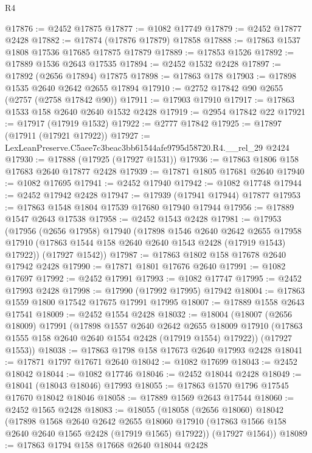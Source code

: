 \begin{lexlean}{R4}
\begin{coremodule}
@17876 := @2452 @17875
@17877 := @1082 @17749
@17879 := @2452 @17877 @2428
@17882 := @17874 (@17876 @17879) @17858
@17888 := @17863 @1537 @1808 @17536 @17685 @17875 @17879
@17889 := @17853 @1526
@17892 := @17889 @1536 @2643 @17535
@17894 := @2452 @1532 @2428
@17897 := @17892 (@2656 @17894) @17875
@17898 := @17863 @178
@17903 := @17898 @1535 @2640 @2642 @2655 @17894
@17910 := @2752 @17842 @90 @2655 (@2757 (@2758 @17842 @90))
@17911 := @17903 @17910
@17917 := @17863 @1533 @158 @2640 @2640 @1532 @2428
@17919 := @2954 @17842 @22
@17921 := @17917 (@17919 @1532)
@17922 := @2777 @17842
@17925 := @17897 (@17911 (@17921 @17922))
@17927 := LexLeanPreserve.C5aee7c3beac3bb61544afe9795d58720.R4.__rel_29 @2424
@17930 := @17888 (@17925 (@17927 @1531))
@17936 := @17863 @1806 @158 @17683 @2640 @17877 @2428
@17939 := @17871 @1805 @17681 @2640
@17940 := @1082 @17695
@17941 := @2452 @17940
@17942 := @1082 @17748
@17944 := @2452 @17942 @2428
@17947 := @17939 (@17941 @17944) @17877
@17953 := @17863 @1548 @1804 @17539 @17680 @17940 @17944
@17956 := @17889 @1547 @2643 @17538
@17958 := @2452 @1543 @2428
@17981 := @17953
    (@17956
      (@2656 @17958)
      @17940
      (@17898
        @1546
        @2640
        @2642
        @2655
        @17958
        @17910
        (@17863 @1544 @158 @2640 @2640 @1543 @2428 (@17919 @1543) @17922))
      (@17927 @1542))
@17987 := @17863 @1802 @158 @17678 @2640 @17942 @2428
@17990 := @17871 @1801 @17676 @2640
@17991 := @1082 @17697
@17992 := @2452 @17991
@17993 := @1082 @17747
@17995 := @2452 @17993 @2428
@17998 := @17990 (@17992 @17995) @17942
@18004 := @17863 @1559 @1800 @17542 @17675 @17991 @17995
@18007 := @17889 @1558 @2643 @17541
@18009 := @2452 @1554 @2428
@18032 := @18004
    (@18007
      (@2656 @18009)
      @17991
      (@17898
        @1557
        @2640
        @2642
        @2655
        @18009
        @17910
        (@17863 @1555 @158 @2640 @2640 @1554 @2428 (@17919 @1554) @17922))
      (@17927 @1553))
@18038 := @17863 @1798 @158 @17673 @2640 @17993 @2428
@18041 := @17871 @1797 @17671 @2640
@18042 := @1082 @17699
@18043 := @2452 @18042
@18044 := @1082 @17746
@18046 := @2452 @18044 @2428
@18049 := @18041 (@18043 @18046) @17993
@18055 := @17863 @1570 @1796 @17545 @17670 @18042 @18046
@18058 := @17889 @1569 @2643 @17544
@18060 := @2452 @1565 @2428
@18083 := @18055
    (@18058
      (@2656 @18060)
      @18042
      (@17898
        @1568
        @2640
        @2642
        @2655
        @18060
        @17910
        (@17863 @1566 @158 @2640 @2640 @1565 @2428 (@17919 @1565) @17922))
      (@17927 @1564))
@18089 := @17863 @1794 @158 @17668 @2640 @18044 @2428

\end{coremodule}
\end{lexlean}
